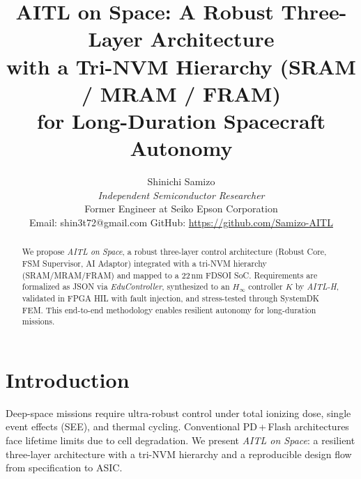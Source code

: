\documentclass[conference]{IEEEtran}
\begin{document}
\title{AITL on Space: A Robust Three-Layer Architecture\\
with a Tri-NVM Hierarchy (SRAM / MRAM / FRAM)\\
for Long-Duration Spacecraft Autonomy}

\author{%
Shinichi Samizo\\
\emph{Independent Semiconductor Researcher}\\
Former Engineer at Seiko Epson Corporation\\
Email: shin3t72@gmail.com \quad GitHub: \url{https://github.com/Samizo-AITL}
}

\maketitle

\begin{abstract}
We propose \emph{AITL on Space}, a robust three-layer control architecture
(Robust Core, FSM Supervisor, AI Adaptor) integrated with a tri-NVM hierarchy
(SRAM/MRAM/FRAM) and mapped to a 22\,nm FDSOI SoC.
Requirements are formalized as JSON via \emph{EduController}, synthesized to an
$H_\infty$ controller \(K\) by \emph{AITL-H}, validated in FPGA HIL with fault
injection, and stress-tested through SystemDK FEM.
This end-to-end methodology enables resilient autonomy for long-duration missions.
\end{abstract}

\section{Introduction}
Deep-space missions require ultra-robust control under total ionizing dose,
single event effects (SEE), and thermal cycling.
Conventional PD\,+\,Flash architectures face lifetime limits due to cell
degradation. We present \emph{AITL on Space}:
a resilient three-layer architecture with a tri-NVM hierarchy and a
reproducible design flow from specification to ASIC.
\end{document}
